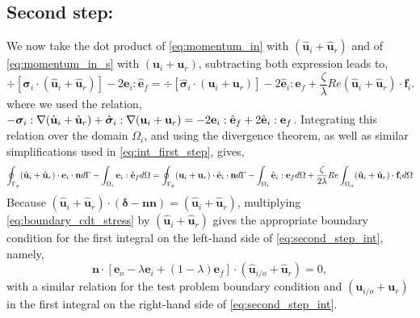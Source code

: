 \subsection{Second step:}

We now take the dot product of \ref{eq:momentum_in} with $(\hat{\textbf{u}}_i + \hat{\textbf{u}}_r)$ and of \ref{eq:momentum_in_s} with $(\textbf{u}_i+ \textbf{u}_r)$, subtracting both expression leads to, 
\begin{equation}
    \div [\bm\sigma_{i}\cdot (\hat{\textbf{u}}_i+\hat{\textbf{u}}_r)]
    - 2\textbf{e}_i : \hat{\textbf{e}}_f
    =
    \div [\hat{\bm\sigma}_{i}\cdot (\textbf{u}_i+\textbf{u}_r)]
    - 2\hat{\textbf{e}}_i :\textbf{e}_f
    + \frac{\zeta}{\lambda} Re (\hat{\textbf{u}}_i+\hat{\textbf{u}}_r)\cdot \textbf{f}_{i}. 
    \label{eq:second_step_out}
\end{equation}
where we used the relation, $- \bm\sigma_i :\mathbf{\nabla} (\hat{\textbf{u}}_i+\hat{\textbf{u}}_r)+ \hat{\bm\sigma}_i :\mathbf{\nabla} ({\textbf{u}}_i+{\textbf{u}}_r) =
- 2\textbf{e}_i :\hat{\textbf{e}}_f + 2\hat{\textbf{e}}_i :\textbf{e}_f$. 
Integrating this relation over the domain $\Omega_i$, and using the divergence theorem, as well as similar simplifications used in \ref{eq:int_first_step}, gives, 
\begin{equation}
    \intS[p]{ (\hat{\textbf{u}}_i+\hat{\textbf{u}}_r)\cdot \textbf{e}_{i}\cdot\textbf{n}}
    - \intO[i]{\textbf{e}_i : \hat{\textbf{e}}_f}
    =
    \intS[p]{ (\textbf{u}_i+\textbf{u}_r)\cdot\hat{\textbf{e}}_{i}\cdot \textbf{n}}
    - \intO[i]{\hat{\textbf{e}}_i :\textbf{e}_f}
    + \frac{\zeta}{2\lambda} Re \intO{(\hat{\textbf{u}}_i+\hat{\textbf{u}}_r)\cdot \textbf{f}_{i}} 
    \label{eq:second_step_int}
\end{equation}
Because $(\hat{\textbf{u}}_i+\hat{\textbf{u}}_r)\cdot (\bm\delta-\textbf{nn}) = (\hat{\textbf{u}}_i+\hat{\textbf{u}}_r)$, multiplying \ref{eq:boundary_cdt_stress} by $(\hat{\textbf{u}}_i+\hat{\textbf{u}}_r)$ gives the appropriate boundary condition for the first integral on the left-hand side of \ref{eq:second_step_int}, namely,
\begin{equation}
    \mathbf{n}\cdot [\textbf{e}_{o} - \lambda \textbf{e}_i + (1 -\lambda) \textbf{e}_f]\cdot (\hat{\textbf{u}}_{i/o}+\hat{\textbf{u}}_r)
    =
    0,
    \label{eq:boundary_with_the_velocity}
\end{equation}
with a similar relation for the test problem boundary condition and $({\textbf{u}}_{i/o}+{\textbf{u}}_r)$ in the first integral on the right-hand side of \ref{eq:second_step_int}. 

